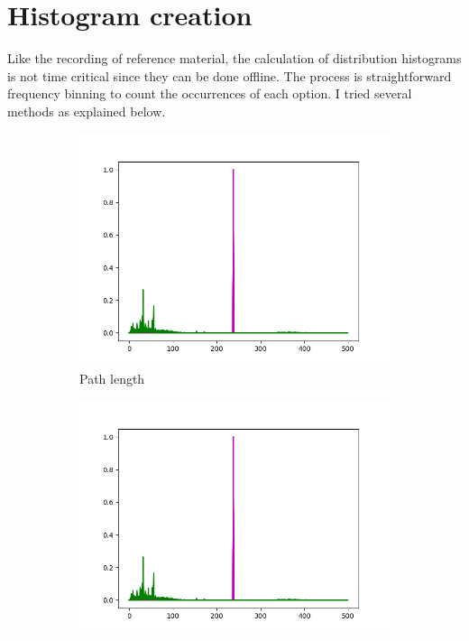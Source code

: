 \documentclass[ %
                    author={Samuel Russell},
                supervisor={Prof. Bogdan Warinschi},
                    degree={MEng},
                     title={Innocuous Ciphertexts},
                  subtitle={The DE-CENSOR Scheme},
                      type={Research},
                      year={2018} ]{dissertation}
\begin{document}
\section{Histogram creation}

Like the recording of reference material, the calculation of distribution histograms is not time critical since they can be done offline. The process is straightforward frequency binning to count the occurrences of each option. I tried several methods as explained below.


\begin{figure}[h]
	\centering
	\begin{subfigure}[b]{0.24\textwidth}
		\includegraphics[width=\textwidth]{bob}
		\caption{Path length}
		\label{fig:length_hist}
	\end{subfigure}
	\begin{subfigure}[b]{0.24\textwidth}
		\includegraphics[width=\textwidth]{bob}

\end{subfigure}
\end{figure}
\end{document}
